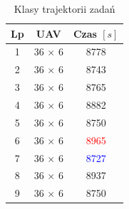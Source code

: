 

\begin{table}[H]
    \caption{Klasy trajektorii zadań}
    \label{tab2}
    \centering
    \begin{tabular}{ccc}
        \toprule
        \textbf{Lp} & \textbf{UAV}  & \textbf{Czas $\left [ s \right ]$} \\ \toprule
        1           & 36 $\times$ 6 & 8778                               \\
        2           & 36 $\times$ 6 & 8743                               \\
        3           & 36 $\times$ 6 & 8765                               \\
        4           & 36 $\times$ 6 & 8882                               \\
        5           & 36 $\times$ 6 & 8750                               \\
        6           & 36 $\times$ 6 & \textcolor{red}{8965}              \\
        7           & 36 $\times$ 6 & \textcolor{blue}{8727}             \\
        8           & 36 $\times$ 6 & 8937                               \\
        9           & 36 $\times$ 6 & 8750                               \\ \bottomrule
    \end{tabular}
\end{table}



